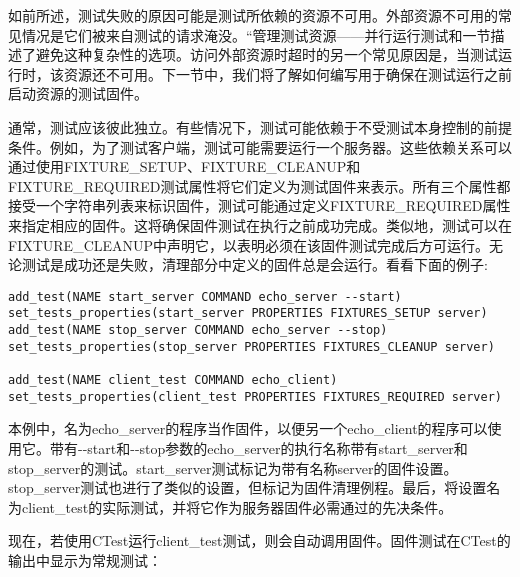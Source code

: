 如前所述，测试失败的原因可能是测试所依赖的资源不可用。外部资源不可用的常见情况是它们被来自测试的请求淹没。“管理测试资源——并行运行测试和一节描述了避免这种复杂性的选项。访问外部资源时超时的另一个常见原因是，当测试运行时，该资源还不可用。下一节中，我们将了解如何编写用于确保在测试运行之前启动资源的测试固件。


通常，测试应该彼此独立。有些情况下，测试可能依赖于不受测试本身控制的前提条件。例如，为了测试客户端，测试可能需要运行一个服务器。这些依赖关系可以通过使用FIXTURE\_SETUP、FIXTURE\_CLEANUP和FIXTURE\_REQUIRED测试属性将它们定义为测试固件来表示。所有三个属性都接受一个字符串列表来标识固件，测试可能通过定义FIXTURE\_REQUIRED属性来指定相应的固件。这将确保固件测试在执行之前成功完成。类似地，测试可以在FIXTURE\_CLEANUP中声明它，以表明必须在该固件测试完成后方可运行。无论测试是成功还是失败，清理部分中定义的固件总是会运行。看看下面的例子:

\begin{lstlisting}[style=styleCMake]
add_test(NAME start_server COMMAND echo_server --start)
set_tests_properties(start_server PROPERTIES FIXTURES_SETUP server)
add_test(NAME stop_server COMMAND echo_server --stop)
set_tests_properties(stop_server PROPERTIES FIXTURES_CLEANUP server)

add_test(NAME client_test COMMAND echo_client)
set_tests_properties(client_test PROPERTIES FIXTURES_REQUIRED server)
\end{lstlisting}

本例中，名为echo\_server的程序当作固件，以便另一个echo\_client的程序可以使用它。带有-{}-start和-{}-stop参数的echo\_server的执行名称带有start\_server和stop\_server的测试。start\_server测试标记为带有名称server的固件设置。stop\_server测试也进行了类似的设置，但标记为固件清理例程。最后，将设置名为client\_test的实际测试，并将它作为服务器固件必需通过的先决条件。

现在，若使用CTest运行client\_test测试，则会自动调用固件。固件测试在CTest的输出中显示为常规测试：


